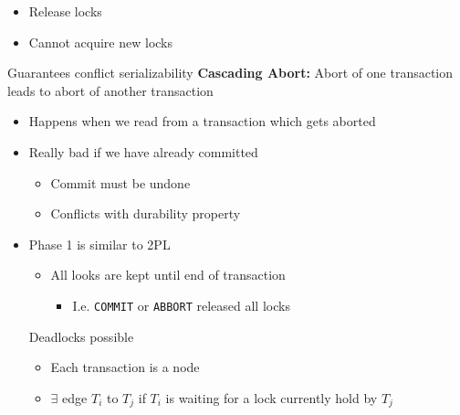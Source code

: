 \begin{itemize}
\begin{itemize}
\begin{itemize}
\begin{itemize}
                            \item Release locks
                            \item Cannot acquire new locks
                        \end{itemize}
                \end{itemize}
            \ipro Guarantees conflict serializability
            \icon \textbf{Cascading Abort:} Abort of one transaction leads to abort of another transaction
                \begin{itemize}
                    \item Happens when we read from a transaction which gets aborted
                    \item Really bad if we have already committed
                        \begin{itemize}
                            \item Commit must be undone
                            \item Conflicts with durability property
                        \end{itemize}
                \end{itemize}
        \end{itemize}
        \begin{itemize}
            \item Phase 1 is similar to 2PL
                \begin{itemize}
                    \item All looks are kept until end of transaction
                        \begin{itemize}
                            \item I.e. \verb+COMMIT+ or \verb+ABBORT+ released all locks
                        \end{itemize}
                \end{itemize}
            \icon Deadlocks possible
                \begin{itemize}
                        \begin{itemize}
                            \item Each transaction is a node
                            \item $\exists$ edge $T_i$ to $T_j$ if $T_i$ is waiting for a lock currently hold by $T_j$
                        \end{itemize}

\end{itemize}
\end{itemize}
\end{itemize}
